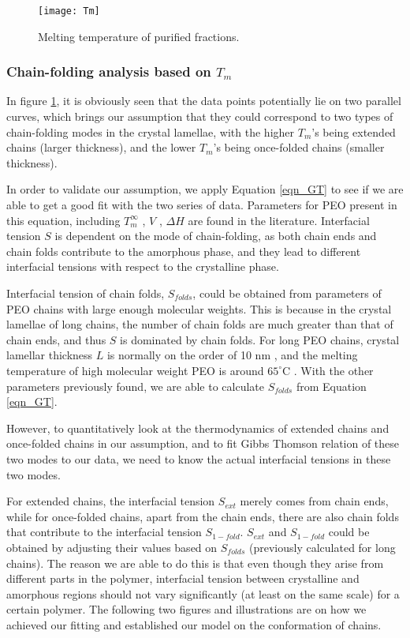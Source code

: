 \begin{figure}[H]
\center
\texttt{[image: Tm]}
\caption{Melting temperature of purified fractions.}
\label{fig:Tm}
\end{figure}

\subsubsection{Chain-folding analysis based on $T_{m}$}

In figure \ref{fig:Tm}, it is obviously seen that the data points potentially lie on two parallel curves, which brings our assumption that they could correspond to two types of chain-folding modes in the crystal lamellae, with the higher $T_{m}$'s being extended chains (larger thickness), and the lower $T_{m}$'s being once-folded chains (smaller thickness).

In order to validate our assumption, we apply Equation \ref{eqn_GT} to see if we are able to get a good fit with the two series of data. Parameters for PEO present in this equation, including $T_{m}^{\infty}$ \cite{Buckley1975}, $V$ \cite{Wong2015}, $\Delta H$ \cite{Yave2010} are found in the literature. Interfacial tension $S$ is dependent on the mode of chain-folding, as both chain ends and chain folds contribute to the amorphous phase, and they lead to different interfacial tensions with respect to the crystalline phase.

Interfacial tension of chain folds, $S_{folds}$, could be obtained from parameters of PEO chains with large enough molecular weights. This is because in the crystal lamellae of long chains, the number of chain folds are much greater than that of chain ends, and thus $S$ is dominated by chain folds. For long PEO chains, crystal lamellar thickness $L$ is normally on the order of 10 nm \cite{Okerberg2007}, and the melting temperature of high molecular weight PEO is around $65^\circ$C \cite{Herzberger2015}. With the other parameters previously found, we are able to calculate $S_{folds}$ from Equation \ref{eqn_GT}.

However, to quantitatively look at the thermodynamics of extended chains and once-folded chains in our assumption, and to fit  Gibbs Thomson relation of these two modes to our data, we need to know the actual interfacial tensions in these two modes. 

For extended chains, the interfacial tension $S_{ext}$ merely comes from chain ends, while for once-folded chains, apart from the chain ends, there are also chain folds that contribute to the interfacial tension $S_{1-fold}$. $S_{ext}$ and $S_{1-fold}$ could be obtained by adjusting their values based on $S_{folds}$ (previously calculated for long chains). The reason we are able to do this is that even though they arise from different parts in the polymer, interfacial tension between crystalline and amorphous regions should not vary significantly (at least on the same scale) for a certain polymer. The following two figures and illustrations are on how we achieved our fitting and established our model on the conformation of chains.

